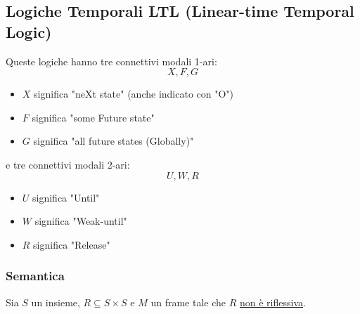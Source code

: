 \documentclass[../main.tex]{subfiles}
\begin{document}
\subsection{Logiche Temporali LTL (Linear-time Temporal Logic)}
Queste logiche hanno tre connettivi modali 1-ari:
\begin{equation*}
    X, F, G
\end{equation*}
\begin{itemize}
    \item $X$ significa "neXt state" (anche indicato con "O")
    \item $F$ significa "some Future state"
    \item $G$ significa "all future states (Globally)"
\end{itemize}
e tre connettivi modali 2-ari:
\begin{equation*}
    U, W, R
\end{equation*}
\begin{itemize}
    \item $U$ significa "Until"
    \item $W$ significa "Weak-until"
    \item $R$ significa "Release"
\end{itemize}
\subsubsection{Semantica}
Sia $S$ un insieme, $R \subseteq S \times S$ e $M$ un frame tale che $R$ \underline{non è riflessiva}.
\end{document}
